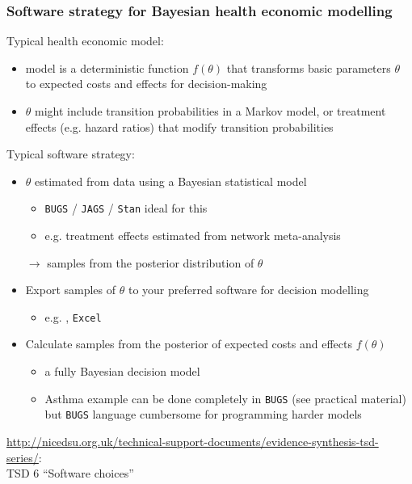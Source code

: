 \begin{frame}

  \frametitle{Software strategy for Bayesian health economic modelling} 

  Typical health economic model:
  \begin{itemize}

  \item model is a \alert{deterministic
      function} $f(\theta)$ that transforms basic parameters $\theta$ to expected costs and effects for decision-making

  \item $\theta$ might include transition probabilities in a Markov
    model, or treatment effects (e.g. hazard ratios) that modify
    transition probabilities
  \end{itemize}

  \pause
  Typical software strategy:
  
 \begin{itemize}

 \item $\theta$ estimated from data using a Bayesian statistical model
   \begin{itemize}
   \item \texttt{BUGS} / \texttt{JAGS} / \texttt{Stan} ideal for this
   \item e.g. treatment effects estimated from network meta-analysis
   \end{itemize}
   $\rightarrow$ samples from the posterior distribution of $\theta$

   \pause 
  \item Export samples of $\theta$ to your preferred software for decision
    modelling
    \begin{itemize}
    \item e.g. \R, \texttt{Excel}
    \end{itemize}

  \item Calculate samples from the posterior of expected costs and effects
    $f(\theta)$
    \begin{itemize}
    \item a fully Bayesian decision model

  \item Asthma example can be done completely in \texttt{BUGS} (see practical material) but \texttt{BUGS} language cumbersome for programming harder models 

  \end{itemize}


  \end{itemize}

  \footnotesize
  \url{http://nicedsu.org.uk/technical-support-documents/evidence-synthesis-tsd-series/}:\\ TSD 6 ``Software choices''
  
\end{frame}


